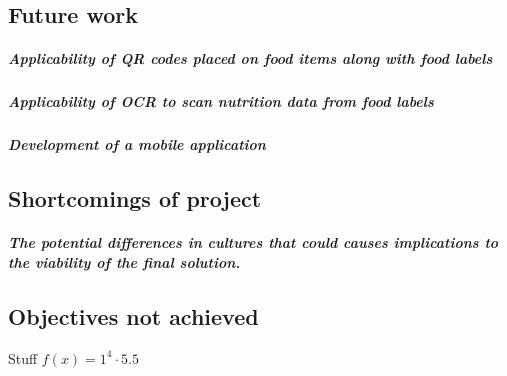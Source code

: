 \documentclass[11pt]{article}
\begin{document}
	\subsection{Future work}
		\subparagraph{Applicability of QR codes placed on food items along with food 				labels}
		\subparagraph{Applicability of OCR to scan nutrition data from food labels}
		\subparagraph{Development of a mobile application}
	\subsection{Shortcomings of project}
		\subparagraph{The potential differences in cultures that could causes implications to the viability of the final solution.}
		\subparagraph{}
	\subsection{Objectives not achieved}
	Stuff
	$f(x)=1^4\cdot5.5$
\pagebreak

\end{document}
